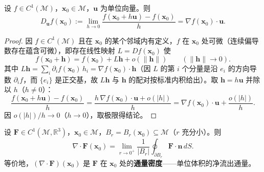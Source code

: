 \begin{proposition}[梯度与方向导数]\label{prop:gradient_directional}
设 $f \in C^1(\mathcal{M})$，$\mathbf{x}_0 \in \mathcal{M}$，$\mathbf{u}$ 为单位向量。则
\[
D_{\mathbf{u}} f(\mathbf{x}_0) := \lim_{h\to0}\frac{f(\mathbf{x}_0+h\mathbf{u})-f(\mathbf{x}_0)}{h} = \nabla f(\mathbf{x}_0)\cdot\mathbf{u}.
\]
\end{proposition}

\begin{proof}
因 $f\in C^1(\mathcal M)$ 且在 $\mathbf x_0$ 的某个邻域内有定义，$f$ 在 $\mathbf x_0$ 处可微（连续偏导数存在蕴含可微），即存在线性映射 $L = Df(\mathbf x_0)$ 使
\[
f(\mathbf x_0+\mathbf h) = f(\mathbf x_0) + L\mathbf h + o(\|\mathbf h\|)\qquad(\|\mathbf h\|\to0).
\]
其中 $L\mathbf h = \sum_i \partial_i f(\mathbf x_0)\,h_i = \nabla f(\mathbf x_0)\cdot\mathbf h$（因 $L$ 的第 $i$ 个分量是沿 $e_i$ 的方向导数 $\partial_i f$，而 $\{e_i\}$ 是正交基，故 $L\mathbf h$ 与 $\mathbf h$ 的配对按标准内积给出）。取 $\mathbf h = h\mathbf u$ 并除以 $h$（$h\ne0$）：
\[
\frac{f(\mathbf x_0+h\mathbf u)-f(\mathbf x_0)}{h}
= \frac{h\,\nabla f(\mathbf x_0)\cdot\mathbf u + o(|h|)}{h}
= \nabla f(\mathbf x_0)\cdot\mathbf u + \frac{o(|h|)}{h}.
\]
因 $o(|h|)/h \to 0$（$h\to0$），取极限得结论。
\end{proof}

\begin{proposition}[散度是通量密度]\label{prop:divergence_flux_density}
设 $\mathbf{F} \in C^1(\mathcal{M}, \mathbb{R}^3)$，$\mathbf{x}_0 \in \mathcal{M}$，$B_r = B_r(\mathbf{x}_0) \subseteq \mathcal M$（$r$ 充分小）。则
\[
\nabla \cdot \mathbf{F}(\mathbf{x}_0)
= \lim_{r \to 0^{+}} \frac{1}{|B_r|}\oint_{\partial B_r} \mathbf{F} \cdot \mathbf{n} \, dS .
\]
等价地，$(\nabla\cdot\mathbf F)(\mathbf x_0)$ 是 $\mathbf F$ 在 $\mathbf x_0$ 处的\textbf{通量密度}——单位体积的净流出通量。
\end{proposition}

